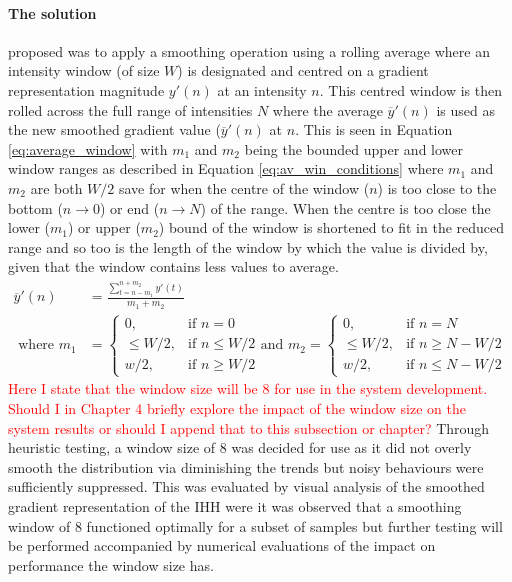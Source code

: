 \paragraph{The solution} proposed was to apply a smoothing operation using a rolling average where an intensity window (of size $W$) is designated and centred on a gradient representation magnitude $y'(n)$ at an intensity $n$. This centred window is then rolled across the full range of intensities $N$ where the average $\overline{y}'(n)$ is used as the new smoothed gradient value ($\overline{y}'(n)$ at $n$. This is seen in Equation \ref{eq:average_window} with $m_1$ and $m_2$ being the bounded upper and lower window ranges as described in Equation \ref{eq:av_win_conditions} where $m_1$ and $m_2$ are both $W/2$ save for when the centre of the window ($n$) is too close to the bottom ($n\to 0$) or end ($n\to N$) of the range. When the centre is too close the lower ($m_1$) or upper ($m_2$) bound of the window is shortened to fit in the reduced range and so too is the length of the window by which the value is divided by, given that the window contains less values to average.
\begin{align}\label{eq:average_window}
        \overline{y}'(n) &= \frac{\sum_{t=n-m_1}^{n+m_2}y'(t)}{m_1+m_2}\\ \label{eq:av_win_conditions}
    \text{ where }m_1 &=\begin{cases}
        0, & \text{if } n=0\\
        \leq W/2, & \text{if } n \leq W/2\\
        w/2, & \text{if } n \geq W/2
    \end{cases}
    \text{and }m_2 = \begin{cases}
                0, & \text{if } n=N\\
        \leq W/2, & \text{if } n \geq N-W/2\\
        w/2, & \text{if } n \leq N-W/2
    \end{cases}
\end{align}
\textcolor{red}{Here I state that the window size will be 8 for use in the system development. Should I in Chapter 4 briefly explore the impact of the window size on the system results or should I append that to this subsection or chapter?}
Through heuristic testing, a window size of $8$ was decided for use as it did not overly smooth the distribution via diminishing the trends but noisy behaviours were sufficiently suppressed. This was evaluated by visual analysis of the smoothed gradient representation of the IHH were it was observed that a smoothing window of $8$ functioned optimally for a subset of samples but further testing will be performed accompanied by numerical evaluations of the impact on performance the window size has. 

